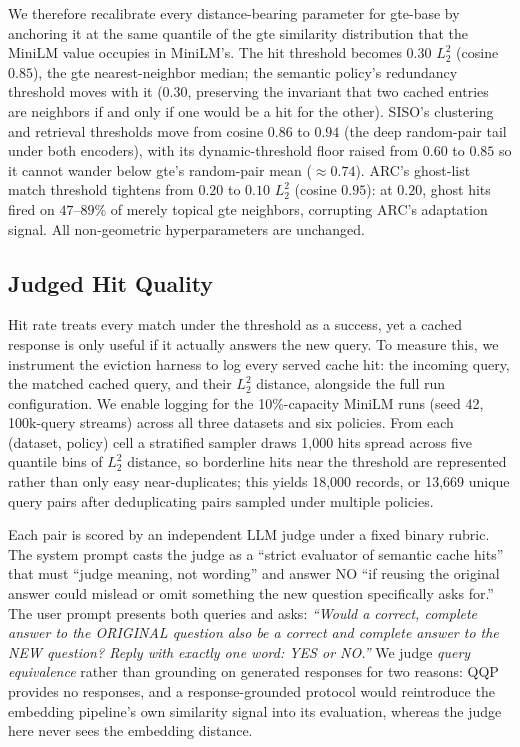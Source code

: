 \documentclass[sigconf,nonacm]{acmart}
\begin{document}
We therefore recalibrate every distance-bearing parameter for gte-base by
anchoring it at the same quantile of the gte similarity distribution that the
MiniLM value occupies in MiniLM's. The hit threshold becomes $0.30$ $L_2^2$
(cosine $0.85$), the gte nearest-neighbor median; the semantic policy's
redundancy threshold moves with it ($0.30$, preserving the invariant that two
cached entries are neighbors if and only if one would be a hit for the other). SISO's
clustering and retrieval thresholds move from cosine $0.86$ to $0.94$
(the deep random-pair tail under both encoders), with its dynamic-threshold
floor raised from $0.60$ to $0.85$ so it cannot wander below gte's random-pair
mean ($\approx 0.74$). ARC's ghost-list match threshold tightens from $0.20$
to $0.10$ $L_2^2$ (cosine $0.95$): at $0.20$, ghost hits fired on
$47$--$89\%$ of merely topical gte neighbors, corrupting ARC's adaptation
signal. All non-geometric hyperparameters are unchanged.

\subsection{Judged Hit Quality}
\label{sec:judge}
Hit rate treats every match under the threshold as a success, yet a
cached response is only useful if it actually answers the new query.
To measure this, we instrument the eviction harness to log every
served cache hit: the incoming query, the matched cached query, and
their $L_2^2$ distance, alongside the full run configuration. We
enable logging for the 10\%-capacity MiniLM runs (seed 42, 100k-query
streams) across all three datasets and six policies. From each
(dataset, policy) cell a stratified sampler draws 1{,}000 hits spread
across five quantile bins of $L_2^2$ distance, so borderline hits near
the threshold are represented rather than only easy near-duplicates;
this yields 18{,}000 records, or 13{,}669 unique query pairs after
deduplicating pairs sampled under multiple policies.

Each pair is scored by an independent LLM judge \cite{zheng2023judging}
under a fixed binary rubric. The system prompt casts the judge as a ``strict evaluator of
semantic cache hits'' that must ``judge meaning, not wording'' and
answer NO ``if reusing the original answer could mislead or omit
something the new question specifically asks for.'' The user prompt
presents both queries and asks: \emph{``Would a correct, complete
answer to the ORIGINAL question also be a correct and complete answer
to the NEW question? Reply with exactly one word: YES or NO.''} We
judge \emph{query equivalence} rather than grounding on generated
responses for two reasons: QQP provides no responses, and a
response-grounded protocol would reintroduce the embedding pipeline's
own similarity signal into its evaluation, whereas the judge here
never sees the embedding distance.
\end{document}
